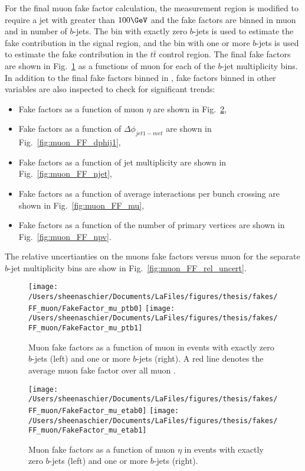For the final muon fake factor calculation, the measurement region is modified to require a jet with \pt{} greater than $100\GeV$ and the fake factors are binned in muon \pt and in number of $b$-jets.  The bin with exactly zero $b$-jets is used to estimate the fake contribution in the signal region, and the bin with one or more $b$-jets is used to estimate the fake contribution in the $t\bar{t}$ control region.  The final fake factors are shown in Fig.~\ref{fig:muon_FF_hist} as a functions of muon \pt{} for each of the $b$-jet multiplicity bins.  In addition to the final fake factors binned in \pt, fake factors binned in other variables are also inspected to check for significant trends:
\begin{itemize}
\item Fake factors as a function of muon $\eta$ are shown in Fig.~\ref{fig:muon_FF_hist_eta},
\item Fake factors as a function of $\Delta\phi_{jet1-met}$ are shown in Fig.~\ref{fig:muon_FF_dphij1},
\item Fake factors as a function of jet multiplicity are shown in Fig.~\ref{fig:muon_FF_njet},
\item Fake factors as a function of average interactions per bunch crossing are shown in Fig.~\ref{fig:muon_FF_mu},
\item Fake factors as a function of the number of primary vertices are shown in Fig.~\ref{fig:muon_FF_npv}.
\end{itemize}
The relative uncertianties on the muons fake factors versus muon \pt{} for the separate $b$-jet multiplicity bins are show in Fig.~\ref{fig:muon_FF_rel_uncert}.
\begin{figure}[tbp]
  \centering
  \texttt{[image: /Users/sheenaschier/Documents/LaFiles/figures/thesis/fakes/FF\_muon/FakeFactor\_mu\_ptb0]}
  \texttt{[image: /Users/sheenaschier/Documents/LaFiles/figures/thesis/fakes/FF\_muon/FakeFactor\_mu\_ptb1]}\\
  \caption{Muon fake factors as a function of muon \pt{} in events with exactly zero $b$-jets (left) and one or more $b$-jets (right). A red line denotes the average muon fake factor over all muon \pt{}.}
  \label{fig:muon_FF_hist}
\end{figure}

\begin{figure}[tbp]
  \centering
  \texttt{[image: /Users/sheenaschier/Documents/LaFiles/figures/thesis/fakes/FF\_muon/FakeFactor\_mu\_etab0]}
  \texttt{[image: /Users/sheenaschier/Documents/LaFiles/figures/thesis/fakes/FF\_muon/FakeFactor\_mu\_etab1]}\\
  \caption{Muon fake factors as a function of muon $\eta$ in events with exactly zero $b$-jets (left) and one or more $b$-jets (right).}
  \label{fig:muon_FF_hist_eta}
\end{figure}

